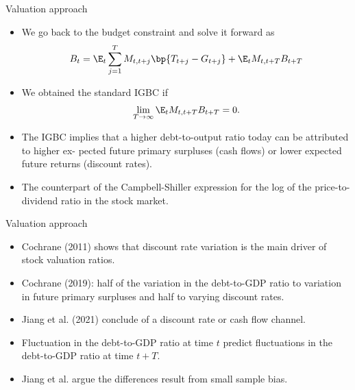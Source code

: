 \documentclass[11pt,xcolor={dvipsnames},aspectratio=159,hyperref={pdftex,pdfpagemode=UseNone,hidelinks,pdfdisplaydoctitle=true},usepdftitle=false]{beamer}
\begin{document}
\begin{frame}
\end{frame}

\begin{frame}{Valuation approach}
    \begin{itemize}
        \item We go back to the budget constraint and solve it forward as 
        \begin{align*}
            B_t = \E_t \sum_{j=1}^T M_{t,t+j} \bp{T_{t+j}-G_{t+j}} + \E_t M_{t,t+T} B_{t+T}
        \end{align*}
        \item We obtained the standard IGBC if \begin{align*}
            \lim_{T\to\infty} \E_t M_{t,t+T} B_{t+T} = 0.
        \end{align*}
        \item The IGBC implies that a higher debt-to-output ratio today can be attributed to higher ex-
        pected future primary surpluses (cash flows) or lower expected future returns (discount rates).
        \item The counterpart of the Campbell-Shiller expression for the log of the price-to-dividend ratio in the stock market. 
    \end{itemize}
\end{frame}

\begin{frame}{Valuation approach}
    \begin{itemize}
        \item Cochrane (2011) shows that discount rate variation is
        the main driver of stock valuation ratios.
        \item Cochrane (2019): half of the variation in the debt-to-GDP ratio to variation in future primary surpluses and half to varying discount rates.
        \item Jiang et al. (2021) conclude  of a discount rate or cash flow channel. 
        \item Fluctuation in the debt-to-GDP ratio at time $t$ predict fluctuations in the debt-to-GDP ratio at time $t+T$.
        \item Jiang et al. argue the differences result from small sample bias. 
    \end{itemize}
\end{frame}
\end{document}
